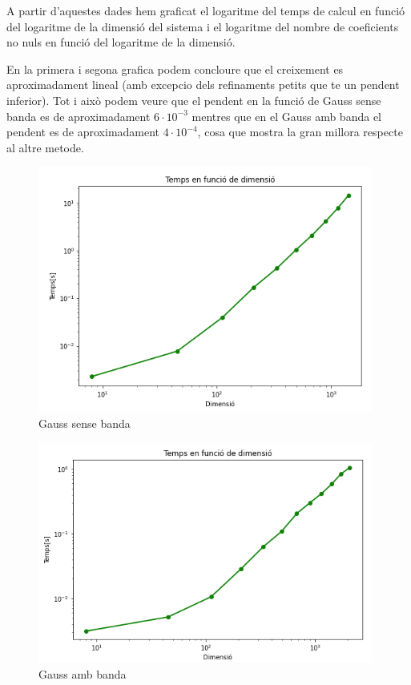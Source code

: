 \documentclass[12pt, a4papre]{article}
\begin{document}
	A partir d'aquestes dades hem graficat el logaritme del temps de calcul en funció del logaritme de la dimensió del sistema i el logaritme del nombre de coeficients no nuls en funció del logaritme de la dimensió. 
	
	En la primera i segona grafica podem concloure que el creixement es aproximadament lineal (amb excepcio dels refinaments petits que te un pendent inferior). Tot i això podem veure que el pendent en la funció de Gauss sense banda es de aproximadament $6\cdot 10^{-3}$ mentres que en el Gauss amb banda el pendent es de aproximadament $4\cdot 10^{-4}$, cosa que mostra la gran millora respecte al altre metode.
	
	\begin{figure}[H]
		\begin{center}
		\includegraphics[width=110mm]{t_dim_nob.png}
		\caption{Gauss sense banda}
		\end{center}
	\end{figure}
	
	\begin{figure}[H]
		\begin{center}
		\includegraphics[width=110mm]{t_dim_b.png}
		\caption{Gauss amb banda}
		\end{center}
	\end{figure}
	
\end{document}
